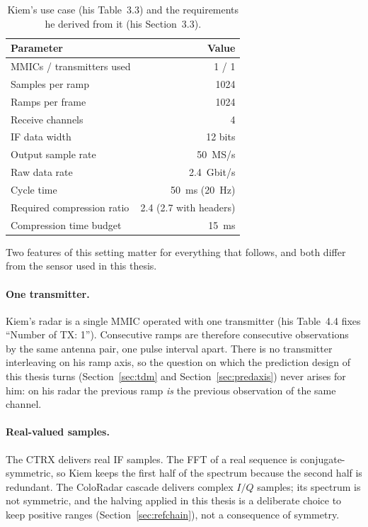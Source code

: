 \begin{table}[htbp]
\centering
\caption[Kiem's use case]{Kiem's use case (his Table~3.3) and the
requirements he derived from it (his Section~3.3).}
\label{tab:kc_usecase}
\small
\begin{tabular}{@{}lr@{}}
\toprule
Parameter & Value\\
\midrule
MMICs / transmitters used & 1 / 1\\
Samples per ramp & 1024\\
Ramps per frame & 1024\\
Receive channels & 4\\
IF data width & 12 bits\\
Output sample rate & \SI{50}{MS/s}\\
Raw data rate & \SI{2.4}{Gbit/s}\\
Cycle time & \SI{50}{\milli\second} (\SI{20}{\hertz})\\
\midrule
Required compression ratio & 2.4 (2.7 with headers)\\
Compression time budget & \SI{15}{\milli\second}\\
\bottomrule
\end{tabular}
\end{table}

Two features of this setting matter for everything that follows, and both
differ from the sensor used in this thesis.

\paragraph{One transmitter.} Kiem's radar is a single MMIC operated with one
transmitter (his Table~4.4 fixes ``Number of TX: 1''). Consecutive ramps are
therefore consecutive observations by the same antenna pair, one pulse interval
apart. There is no transmitter interleaving on his ramp axis, so the question
on which the prediction design of this thesis turns (Section~\ref{sec:tdm} and
Section~\ref{sec:predaxis}) never arises for him: on his radar the previous ramp
\emph{is} the previous observation of the same channel.

\paragraph{Real-valued samples.} The CTRX delivers real IF samples. The FFT of
a real sequence is conjugate-symmetric, so Kiem keeps the first half of the
spectrum because the second half is redundant. The ColoRadar cascade delivers
complex $I/Q$ samples; its spectrum is not symmetric, and the halving applied
in this thesis is a deliberate choice to keep positive ranges
(Section~\ref{sec:refchain}), not a consequence of symmetry.

